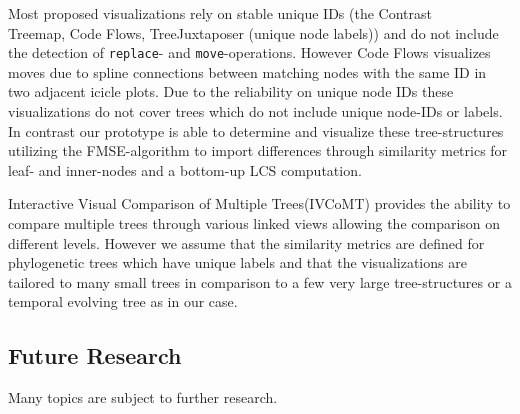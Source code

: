 
Most proposed visualizations rely on stable unique IDs (the Contrast\\Treemap\cite{tu2007visualizing}, Code Flows\cite{telea2008code}, TreeJuxtaposer\cite{munzner2003treejuxtaposer} (unique node labels)) and do not include the detection of \texttt{replace}- and \texttt{move}-operations. However Code Flows visualizes moves due to spline connections between matching nodes with the same ID in two adjacent icicle plots. Due to the reliability on unique node IDs these visualizations do not cover trees which do not include unique node-IDs or labels. In contrast our prototype is able to determine and visualize these tree-structures utilizing the FMSE-algorithm to import differences through similarity metrics for leaf- and inner-nodes and a bottom-up LCS computation.

Interactive Visual Comparison of Multiple Trees(IVCoMT\cite{bremm2011interactive}) provides the ability to compare multiple trees through various linked views allowing the comparison on different levels. However we assume that the similarity metrics are defined for phylogenetic trees which have unique labels and that the visualizations are tailored to many small trees in comparison to a few very large tree-structures or a temporal evolving tree as in our case.

\subsection{Future Research}
Many topics are subject to further research. 

